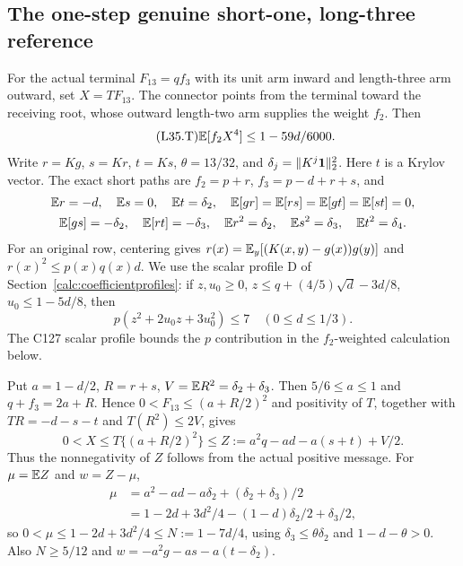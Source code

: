 \subsection{The one-step genuine short-one, long-three reference}\label{proof:Q5-C035}
For the actual terminal $F_{13}=qf_3$ with its unit arm inward and
length-three arm outward, set $X=T F_{13}$. The connector points from
the terminal toward the receiving root, whose outward length-two arm
supplies the weight $f_2$. Then
\begin{equation}\tag{L35.T}\label{eq:L35:claim}
\mathbb E[f_2X^4]\le1-59d/6000.
\end{equation}
Write
$r=Kg$, $s=Kr$, $t=Ks$, $\theta=13/32$, and
$\delta_j=\|K^j\mathbf1\|_2^2$. Here $t$ is a Krylov vector.
The exact short paths are $f_2=p+r$, $f_3=p-d+r+s$, and
\[
\begin{gathered}
\mathbb E r=-d,\quad\mathbb E s=0,\quad\mathbb E t=\delta_2,\quad
\mathbb E[gr]=\mathbb E[rs]=\mathbb E[gt]=\mathbb E[st]=0,\\
\mathbb E[gs]=-\delta_2,\quad\mathbb E[rt]=-\delta_3,\quad
\mathbb E r^2=\delta_2,\quad\mathbb E s^2=\delta_3,\quad\mathbb E t^2=\delta_4.
\end{gathered}
\]
For an original row, centering gives
$r(x)=\mathbb E_y[(K(x,y)-g(x))g(y)]$ and
$r(x)^2\le p(x)q(x)d$.
We use the scalar profile D of Section~\ref{calc:coefficientprofiles}:
if $z,u_0\ge0$, $z\le q+(4/5)\sqrt d-3d/8$,
$u_0\le1-5d/8$, then
\begin{equation}\tag{L35.1.5}\label{eq:L35:pcoefficient}
p(z^2+2u_0z+3u_0^2)\le7\quad(0\le d\le1/3).
\end{equation}
The C127 scalar profile bounds the $p$ contribution in the
$f_2$-weighted calculation below.

Put $a=1-d/2$, $R=r+s$, $V=\mathbb E R^2=\delta_2+\delta_3$.
Then $5/6\le a\le1$ and $q+f_3=2a+R$. Hence
$0<F_{13}\le(a+R/2)^2$ and positivity of $T$, together with
$TR=-d-s-t$ and $T(R^2)\le2V$, gives
\begin{equation}\tag{L35.2.2}\label{eq:L35:envelope}
0<X\le T\{(a+R/2)^2\}\le Z:=a^2q-ad-a(s+t)+V/2.
\end{equation}
Thus the nonnegativity of $Z$ follows from the actual positive message.
For $\mu=\mathbb E Z$ and $w=Z-\mu$,
\[
\begin{aligned}
\mu&=a^2-ad-a\delta_2+(\delta_2+\delta_3)/2\\
&=1-2d+3d^2/4-(1-d)\delta_2/2+\delta_3/2,
\end{aligned}
\]
so $0<\mu\le1-2d+3d^2/4\le N:=1-7d/4$, using
$\delta_3\le\theta\delta_2$ and $1-d-\theta>0$.
Also $N\ge5/12$ and
$w=-a^2g-as-a(t-\delta_2)$.

